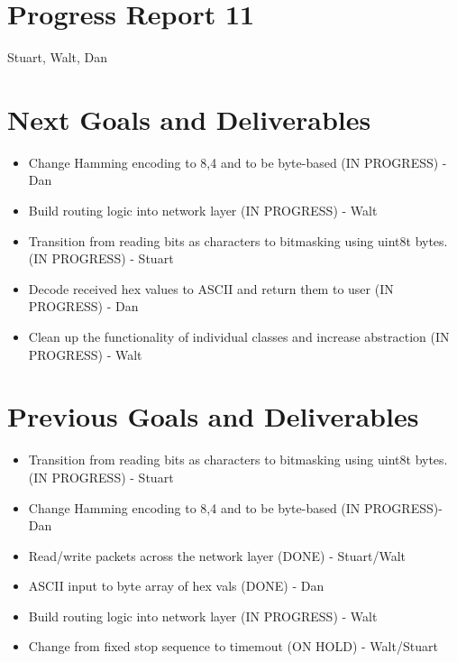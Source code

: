 \documentclass{article}
\begin{document}
\section*{Progress Report 11}
Stuart, Walt, Dan

\section*{Next Goals and Deliverables}
\begin{itemize}
    \item Change Hamming encoding to 8,4 and to be byte-based (IN PROGRESS) - Dan
    \item Build routing logic into network layer (IN PROGRESS) - Walt
    \item Transition from reading bits as characters to bitmasking using uint8t bytes. (IN PROGRESS) - Stuart
    \item Decode received hex values to ASCII and return them to user (IN PROGRESS) - Dan
    \item Clean up the functionality of individual classes and increase abstraction (IN PROGRESS) - Walt
\end{itemize}

\section*{Previous Goals and Deliverables}
\begin{itemize}
    \item Transition from reading bits as characters to bitmasking using uint8t bytes. (IN PROGRESS) - Stuart
    \item Change Hamming encoding to 8,4 and to be byte-based (IN PROGRESS)- Dan
    \item Read/write packets across the network layer (DONE) - Stuart/Walt
    \item ASCII input to byte array of hex vals (DONE) - Dan
    \item Build routing logic into network layer (IN PROGRESS) - Walt
    \item Change from fixed stop sequence to timemout (ON HOLD) - Walt/Stuart
\end{itemize}
\end{document}
